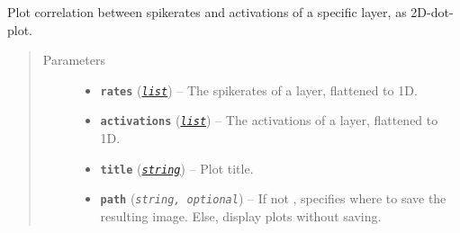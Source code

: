 \documentclass[letterpaper,10pt,english]{sphinxmanual}
\begin{document}
\begin{fulllineitems}
\label{snntoolbox.io_utils:snntoolbox.io_utils.plotting.plot_layer_correlation}
Plot correlation between spikerates and activations of a specific layer,
as 2D-dot-plot.
\begin{quote}\begin{description}
\item[{Parameters}] \leavevmode\begin{itemize}
\item {} 
\textbf{\texttt{rates}} (\href{https://docs.python.org/library/functions.html\#list}{\emph{\texttt{list}}}) -- The spikerates of a layer, flattened to 1D.

\item {} 
\textbf{\texttt{activations}} (\href{https://docs.python.org/library/functions.html\#list}{\emph{\texttt{list}}}) -- The activations of a layer, flattened to 1D.

\item {} 
\textbf{\texttt{title}} (\href{https://docs.python.org/library/string.html\#module-string}{\emph{\texttt{string}}}) -- Plot title.

\item {} 
\textbf{\texttt{path}} (\emph{\texttt{string, optional}}) -- If not , specifies where to save the resulting image. Else,
display plots without saving.

\end{itemize}

\end{description}\end{quote}

\end{fulllineitems}

\end{document}

